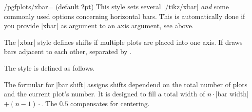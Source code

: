 \begin{stylekey}{/pgfplots/xbar= (default 2pt)}
	This style sets several |/tikz/xbar| \emph{and} some commonly used options concerning horizontal bars. This is automatically done if you provide |xbar| as argument to an axis argument, see above.

The |xbar| style defines shifts if multiple plots are placed into one axis. If draws bars adjacent to each other, separated by .

The style is defined as follows.
The formular for |bar shift| assigns shifts dependend on the total number of plots and the current plot's number. It is designed to fill a total width of $n \cdot $|bar width|$ + (n-1) \cdot $. The $0.5$ compensates for centering.
\end{stylekey}

